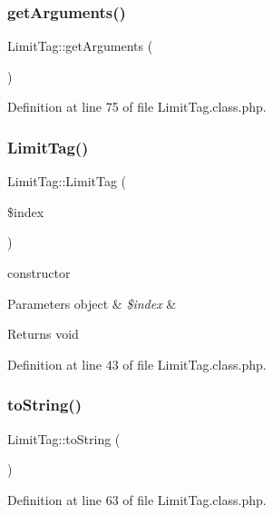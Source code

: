 \subsubsection{\texorpdfstring{get\+Arguments()}{getArguments()}}
{\footnotesize\ttfamily Limit\+Tag\+::get\+Arguments (\begin{DoxyParamCaption}{ }\end{DoxyParamCaption})}



Definition at line 75 of file Limit\+Tag.\+class.\+php.

\mbox{\label{classLimitTag_a9b5dbee572b93d0ae32089e8deed7462}} 
\subsubsection{\texorpdfstring{Limit\+Tag()}{LimitTag()}}
{\footnotesize\ttfamily Limit\+Tag\+::\+Limit\+Tag (\begin{DoxyParamCaption}\item[{}]{\$index }\end{DoxyParamCaption})}

constructor 
\begin{DoxyParams}[1]{Parameters}
object & {\em \$index} & \\
\hline
\end{DoxyParams}
\begin{DoxyReturn}{Returns}
void 
\end{DoxyReturn}


Definition at line 43 of file Limit\+Tag.\+class.\+php.

\mbox{\label{classLimitTag_ae557d296324baf6a0381b18361353e85}} 
\subsubsection{\texorpdfstring{to\+String()}{toString()}}
{\footnotesize\ttfamily Limit\+Tag\+::to\+String (\begin{DoxyParamCaption}{ }\end{DoxyParamCaption})}



Definition at line 63 of file Limit\+Tag.\+class.\+php.



